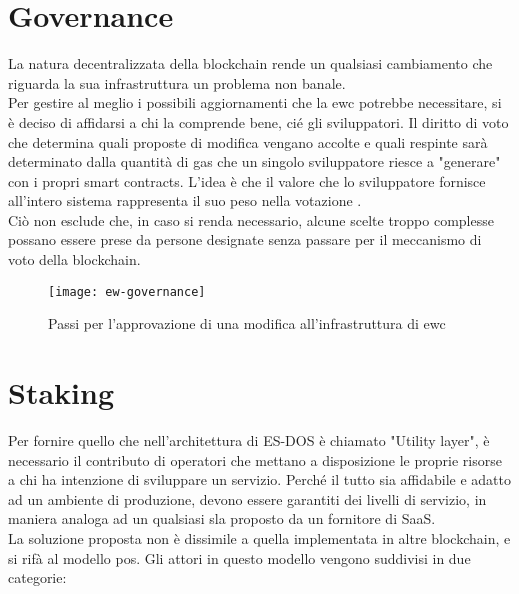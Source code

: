 \section{Governance}
La natura decentralizzata della blockchain rende un qualsiasi cambiamento che riguarda la sua infrastruttura un problema non banale. \\
Per gestire al meglio i possibili aggiornamenti che la \gls{ewc} potrebbe necessitare, si è deciso di affidarsi a chi la comprende bene, cié gli sviluppatori.
Il diritto di voto che determina quali proposte di modifica vengano accolte e quali respinte sarà determinato dalla quantità di gas che un singolo sviluppatore riesce a "generare" con i propri smart contracts.
L'idea è che il valore che lo sviluppatore fornisce all'intero sistema rappresenta il suo peso nella votazione \cite{wiki:ew-governance}. \\
Ciò non esclude che, in caso si renda necessario, alcune scelte troppo complesse possano essere prese da persone designate senza passare per il meccanismo di voto della blockchain.

\begin{figure}[h]
    \texttt{[image: ew-governance]}
    \centering
    \caption{Passi per l'approvazione di una modifica all'infrastruttura di \gls{ewc} \cite{img:ew-governance}}
    \label{lab:ew-governance}
\end{figure}

\section{Staking}
\label{sec:staking}
Per fornire quello che nell'architettura di ES-DOS è chiamato "Utility layer", è necessario il contributo di operatori che mettano a disposizione le proprie risorse a chi ha intenzione di sviluppare un servizio.
Perché il tutto sia affidabile e adatto ad un ambiente di produzione, devono essere garantiti dei livelli di servizio, in maniera analoga ad un qualsiasi \gls{sla} proposto da un fornitore di SaaS. \\
La soluzione proposta non è dissimile a quella implementata in altre blockchain, e si rifà al modello \gls{pos}.
Gli attori in questo modello vengono suddivisi in due categorie:

